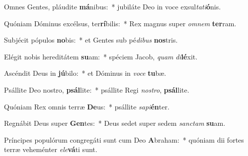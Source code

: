 \item Omnes Gentes, pláudite \textbf{má}nibus:~* jubiláte Deo in voce exsul\textit{ta}\textit{ti}\textbf{ó}nis.
\item Quóniam Dóminus excélsus, ter\textbf{rí}bilis:~* Rex magnus super \textit{om}\textit{nem} \textbf{ter}ram.
\item Subjécit pópulos \textbf{no}bis:~* et Gentes sub pé\textit{di}\textit{bus} \textbf{nos}tris.
\item Elégit nobis hereditátem \textbf{su}am:~* spéciem Jacob, \textit{quam} \textit{di}\textbf{lé}xit.
\item Ascéndit Deus in \textbf{jú}bilo:~* et Dóminus in \textit{vo}\textit{ce} \textbf{tu}bæ.
\item Psállite Deo nostro, \textbf{psál}lite:~* psállite Regi \textit{nos}\textit{tro}, \textbf{psál}lite.
\item Quóniam Rex omnis terræ \textbf{De}us:~* psállite \textit{sa}\textit{pi}\textbf{én}ter.
\item Regnábit Deus super \textbf{Gen}tes:~* Deus sedet super sedem \textit{sanc}\textit{tam} \textbf{su}am.
\item Príncipes populórum congregáti sunt cum Deo \textbf{A}braham:~* quóniam dii fortes terræ veheménter \textit{e}\textit{le}\textbf{vá}ti sunt.
